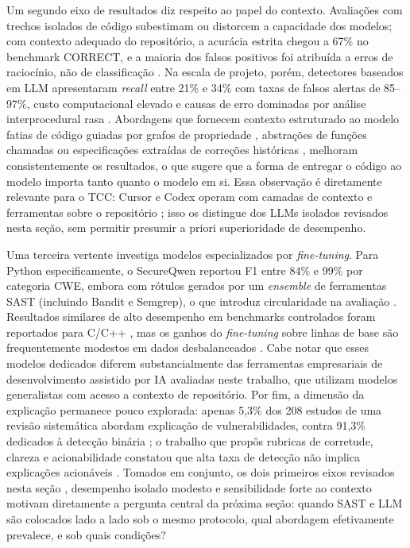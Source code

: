 Um segundo eixo de resultados diz respeito ao papel do contexto. Avaliações com trechos isolados de código subestimam ou distorcem a capacidade dos modelos; com contexto adequado do repositório, a acurácia estrita chegou a 67\% no benchmark CORRECT, e a maioria dos falsos positivos foi atribuída a erros de raciocínio, não de classificação \cite{Li2025LLMVDAsk}. Na escala de projeto, porém, detectores baseados em LLM apresentaram \textit{recall} entre 21\% e 34\% com taxas de falsos alertas de 85–97\%, custo computacional elevado e causas de erro dominadas por análise interprocedural rasa \cite{Li2026ProjectScaleLLM}. Abordagens que fornecem contexto estruturado ao modelo  fatias de código guiadas por grafos de propriedade \cite{Lekssays2025LLMxCPG}, abstrações de funções chamadas \cite{Yang2025ContextVD} ou especificações extraídas de correções históricas \cite{Zhu2025SpecGuidedVD} , melhoram consistentemente os resultados, o que sugere que a forma de entregar o código ao modelo importa tanto quanto o modelo em si. Essa observação é diretamente relevante para o TCC: Cursor e Codex operam com camadas de contexto e ferramentas sobre o repositório \cite{Cursor2025Docs, OpenAI2025CodexDocs}; isso os distingue dos LLMs isolados revisados nesta seção, sem permitir presumir a priori superioridade de desempenho.

Uma terceira vertente investiga modelos especializados por \textit{fine-tuning}. Para Python especificamente, o SecureQwen reportou F1 entre 84\% e 99\% por categoria CWE, embora com rótulos gerados por um \textit{ensemble} de ferramentas SAST (incluindo Bandit e Semgrep), o que introduz circularidade na avaliação \cite{Mechri2025SecureQwen}. Resultados similares de alto desempenho em benchmarks controlados foram reportados para C/C++ \cite{Ferrag2025SecureFalcon}, mas os ganhos do \textit{fine-tuning} sobre linhas de base são frequentemente modestos em dados desbalanceados \cite{Shestov2025LLMFinetune}. Cabe notar que esses modelos dedicados diferem substancialmente das ferramentas empresariais de desenvolvimento assistido por IA avaliadas neste trabalho, que utilizam modelos generalistas com acesso a contexto de repositório. Por fim, a dimensão da explicação permanece pouco explorada: apenas 5,3\% dos 208 estudos de uma revisão sistemática abordam explicação de vulnerabilidades, contra 91,3\% dedicados à detecção binária \cite{Germano2025LLMSLR}; o trabalho que propôs rubricas de corretude, clareza e acionabilidade constatou que alta taxa de detecção não implica explicações acionáveis \cite{Mao2025ExplainableVD}. Tomados em conjunto, os dois primeiros eixos revisados nesta seção , desempenho isolado modesto e sensibilidade forte ao contexto motivam diretamente a pergunta central da próxima seção: quando SAST e LLM são colocados lado a lado sob o mesmo protocolo, qual abordagem efetivamente prevalece, e sob quais condições?



